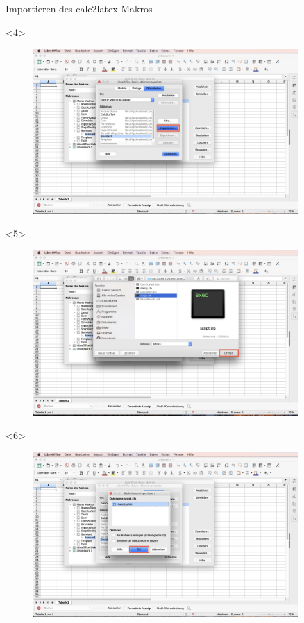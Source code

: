 \begin{frame}[c]{Importieren des calc2latex-Makros}
\begin{onlyenv}
\begin{figure}[htbp]
		\end{figure}
	\end{onlyenv}
	\begin{onlyenv}
		\begin{figure}[htbp]
			\centering
			\includegraphics[width=0.9\textwidth]{img/Bildschirmfoto_mitKasten/1_Importieren_Macro/4.jpg}
		\end{figure}
	\end{onlyenv}
	\begin{onlyenv}
		\begin{figure}[htbp]
			\centering
			\includegraphics[width=0.9\textwidth]{img/Bildschirmfoto_mitKasten/1_Importieren_Macro/5.jpg}
		\end{figure}
	\end{onlyenv}
	\begin{onlyenv}
		\begin{figure}[htbp]
			\centering
			\includegraphics[width=0.9\textwidth]{img/Bildschirmfoto_mitKasten/1_Importieren_Macro/6.jpg}

\end{figure}
\end{onlyenv}
\end{frame}
